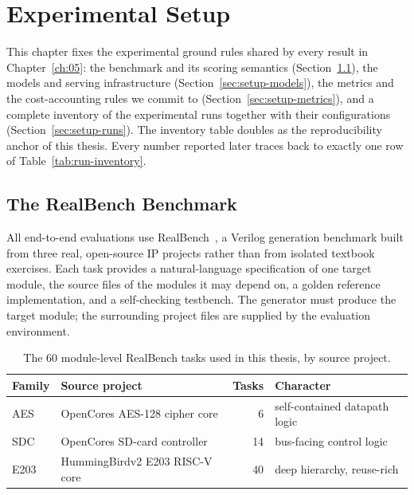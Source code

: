 
\chapter{Experimental Setup}
\label{ch:04}

This chapter fixes the experimental ground rules shared by every result in
Chapter~\ref{ch:05}: the benchmark and its scoring semantics
(Section~\ref{sec:setup-realbench}), the models and serving infrastructure
(Section~\ref{sec:setup-models}), the metrics and the cost-accounting rules we
commit to (Section~\ref{sec:setup-metrics}), and a complete inventory of the
experimental runs together with their configurations
(Section~\ref{sec:setup-runs}). The inventory table doubles as the
reproducibility anchor of this thesis. Every number reported later traces back
to exactly one row of Table~\ref{tab:run-inventory}.

\section{The RealBench Benchmark}
\label{sec:setup-realbench}

All end-to-end evaluations use RealBench~\citep{realbench2025}, a Verilog
generation benchmark built from three real, open-source IP projects rather
than from isolated textbook exercises. Each task provides a natural-language
specification of one target module, the source files of the modules it may
depend on, a golden reference implementation, and a self-checking testbench.
The generator must produce the target module; the surrounding project files
are supplied by the evaluation environment.

\begin{table}[htbp]
  \centering
  \caption[RealBench module-level task families]{The 60 module-level
    RealBench tasks used in this thesis, by source project.}
  \label{tab:families}
  \small
  \begin{tabular}{llrl}
    \toprule
    Family & Source project & Tasks & Character \\
    \midrule
    AES  & OpenCores AES-128 cipher core & 6  & self-contained datapath logic \\
    SDC  & OpenCores SD-card controller  & 14 & bus-facing control logic \\
    E203 & HummingBirdv2 E203 RISC-V core & 40 & deep hierarchy, reuse-rich \\
    \bottomrule
  \end{tabular}
\end{table}

